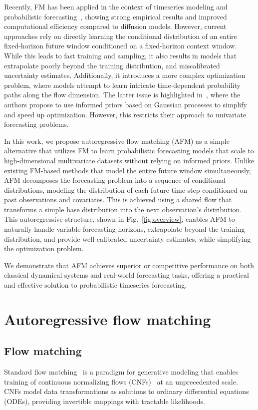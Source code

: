 \documentclass[a4paper,10pt,twocolumn,preprint,3p]{elsarticle}
\begin{document}
Recently, FM has been applied in the context of timeseries modeling and probabilistic forecasting~\citep{Tamir2024, Hu2024, Kerrigan2024Flow}, showing strong empirical results and improved computational efficiency compared to diffusion models. However, current approaches rely on directly learning the conditional distribution of an entire fixed-horizon future window conditioned on a fixed-horizon context window. While this leads to fast training and sampling, it also results in models that extrapolate poorly beyond the training distribution, and miscalibrated uncertainty estimates. Additionally, it introduces a more complex optimization problem, where models attempt to learn intricate time-dependent probability paths along the flow dimension. The latter issue is highlighted in~\citep{Kerrigan2024Flow}, where the authors propose to use informed priors based on Gaussian processes to simplify and speed up optimization. However, this restricts their approach to univariate forecasting problems.

In this work, we propose autoregressive flow matching (AFM) as a simple alternative that utilizes FM to learn probabilistic forecasting models that scale to high-dimensional multivariate datasets without relying on informed priors. Unlike existing FM-based methods that model the entire future window simultaneously, AFM decomposes the forecasting problem into a sequence of conditional distributions, modeling the distribution of each future time step conditioned on past observations and covariates. This is achieved using a shared flow that transforms a simple base distribution into the next observation’s distribution. This autoregressive structure, shown in Fig.~\ref{fig:overview}, enables AFM to naturally handle variable forecasting horizons, extrapolate beyond the training distribution, and provide well-calibrated uncertainty estimates, while simplifying the optimization problem. 

We demonstrate that AFM achieves superior or competitive performance on both classical dynamical systems and real-world forecasting tasks, offering a practical and effective solution to probabilistic timeseries forecasting.



\section{Autoregressive flow matching}

\subsection{Flow matching}
Standard flow matching~\citep{Lipman2022} is a paradigm for generative modeling that enables training of continuous normalizing flows (CNFs)~\citep{chen2018neural, grathwohl2018ffjord} at an unprecedented scale. CNFs model data transformations as solutions to ordinary differential equations (ODEs), providing invertible mappings with tractable likelihoods.
\end{document}

